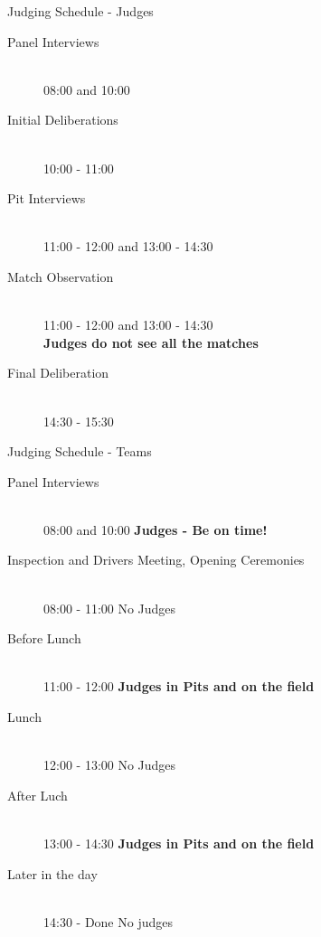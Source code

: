 \documentclass{beamer}
\begin{document}
  \begin{frame}{Judging Schedule - Judges}
    \begin{description}
    \item[Panel Interviews] \hfill \\ 08:00 and 10:00
    \item[Initial Deliberations] \hfill \\ 10:00 - 11:00
    \item[Pit Interviews] \hfill  \\ 11:00 - 12:00 and 13:00 - 14:30
    \item[Match Observation] \hfill \\ 11:00 - 12:00 and 13:00 - 14:30 \\
      \textbf{Judges do not see all the matches}
    \item[Final Deliberation] \hfill \\ 14:30 - 15:30
    \end{description}
  \end{frame}

  \begin{frame}{Judging Schedule - Teams}
    \begin{description}
    \item[Panel Interviews] \hfill
      \\ 08:00 and 10:00 \textbf{Judges - Be on time!}
    \item[Inspection and Drivers Meeting, Opening Ceremonies] \hfill \\
      08:00 - 11:00 No Judges
    \item[Before Lunch] \hfill \\
      11:00 - 12:00 \textbf{Judges in Pits and on the field}
    \item[Lunch] \hfill \\
      12:00 - 13:00 No Judges
    \item[After Luch] \hfill \\
      13:00 - 14:30 \textbf{Judges in Pits and on the field}
    \item[Later in the day] \hfill \\
      14:30 - Done No judges
    \end{description}
  \end{frame}
\end{document}
